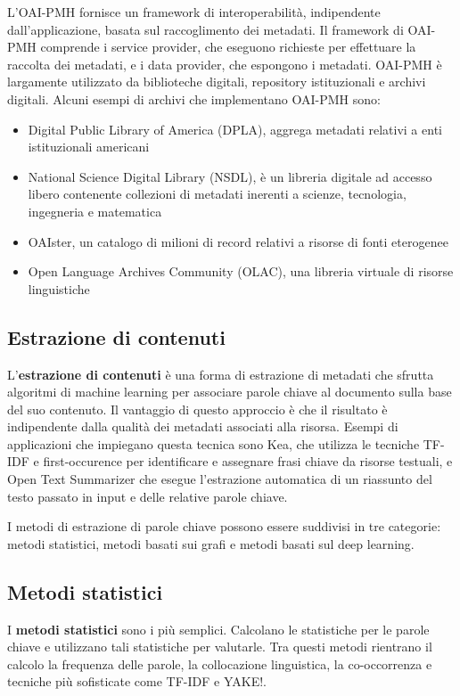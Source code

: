 L'OAI-PMH fornisce un framework di interoperabilità, indipendente dall'applicazione, basata sul raccoglimento dei metadati. Il framework di OAI-PMH comprende i service provider, che eseguono richieste per effettuare la raccolta dei metadati, e i data provider, che espongono i metadati. OAI-PMH è largamente utilizzato da biblioteche digitali, repository istituzionali e archivi digitali\cite{harvesting}. Alcuni esempi di archivi che implementano OAI-PMH sono:

\begin{itemize}
\item Digital Public Library of America (DPLA), aggrega metadati relativi a enti istituzionali americani
\item National Science Digital Library (NSDL), è un libreria digitale ad accesso libero contenente collezioni di metadati inerenti a scienze, tecnologia, ingegneria e matematica
\item OAIster, un catalogo di milioni di record relativi a risorse di fonti eterogenee
\item Open Language Archives Community (OLAC), una libreria virtuale di risorse linguistiche
\end{itemize}

\subsection{Estrazione di contenuti}
L'\textbf{estrazione di contenuti} è una forma di estrazione di metadati che sfrutta algoritmi di machine learning per associare parole chiave al documento sulla base del suo contenuto. Il vantaggio di questo approccio è che il risultato è indipendente dalla qualità dei metadati associati alla risorsa. Esempi di applicazioni che impiegano questa tecnica sono Kea, che utilizza le tecniche TF-IDF e first-occurence per identificare e assegnare frasi chiave da risorse testuali, e Open Text Summarizer che esegue l'estrazione automatica di un riassunto del testo passato in input e delle relative parole chiave. 

I metodi di estrazione di parole chiave possono essere suddivisi in tre categorie: metodi statistici, metodi basati sui grafi e metodi basati sul deep learning\cite{extraction}.

\subsection{Metodi statistici}
I \textbf{metodi statistici} sono i più semplici. Calcolano le statistiche per le parole chiave e utilizzano tali statistiche per valutarle. Tra questi metodi rientrano il calcolo la frequenza delle parole, la collocazione linguistica, la co-occorrenza e tecniche più sofisticate come TF-IDF e YAKE!.

